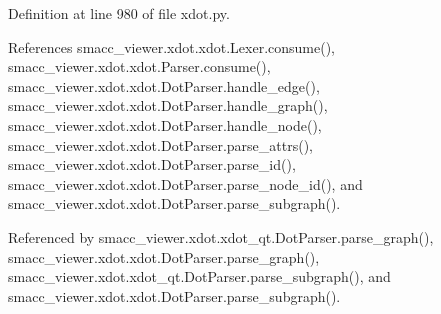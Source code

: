 Definition at line 980 of file xdot.\+py.



References smacc\+\_\+viewer.\+xdot.\+xdot.\+Lexer.\+consume(), smacc\+\_\+viewer.\+xdot.\+xdot.\+Parser.\+consume(), smacc\+\_\+viewer.\+xdot.\+xdot.\+Dot\+Parser.\+handle\+\_\+edge(), smacc\+\_\+viewer.\+xdot.\+xdot.\+Dot\+Parser.\+handle\+\_\+graph(), smacc\+\_\+viewer.\+xdot.\+xdot.\+Dot\+Parser.\+handle\+\_\+node(), smacc\+\_\+viewer.\+xdot.\+xdot.\+Dot\+Parser.\+parse\+\_\+attrs(), smacc\+\_\+viewer.\+xdot.\+xdot.\+Dot\+Parser.\+parse\+\_\+id(), smacc\+\_\+viewer.\+xdot.\+xdot.\+Dot\+Parser.\+parse\+\_\+node\+\_\+id(), and smacc\+\_\+viewer.\+xdot.\+xdot.\+Dot\+Parser.\+parse\+\_\+subgraph().



Referenced by smacc\+\_\+viewer.\+xdot.\+xdot\+\_\+qt.\+Dot\+Parser.\+parse\+\_\+graph(), smacc\+\_\+viewer.\+xdot.\+xdot.\+Dot\+Parser.\+parse\+\_\+graph(), smacc\+\_\+viewer.\+xdot.\+xdot\+\_\+qt.\+Dot\+Parser.\+parse\+\_\+subgraph(), and smacc\+\_\+viewer.\+xdot.\+xdot.\+Dot\+Parser.\+parse\+\_\+subgraph().


